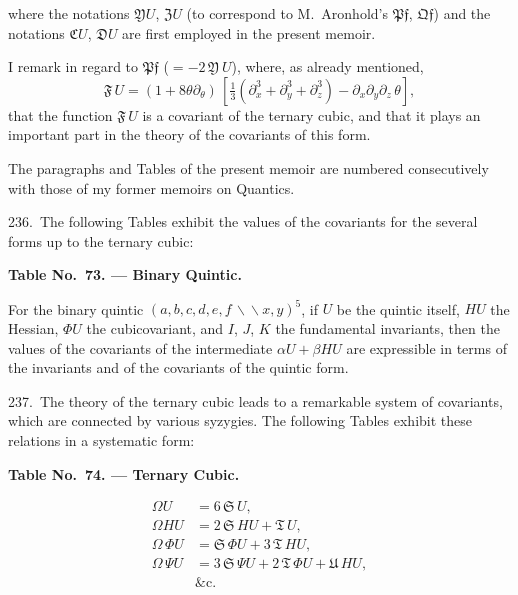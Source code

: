 \documentclass[11pt,a4paper]{article}
\theoremstyle{plain}
\theoremstyle{definition}
\theoremstyle{remark}
\begin{document}
where the notations $\mathfrak{Y}U$, $\mathfrak{Z}U$ (to correspond to M.~Aronhold's $\mathfrak{P}\mathfrak{f}$, $\mathfrak{Q}\mathfrak{f}$) and the notations $\mathfrak{C}U$, $\mathfrak{D}U$ are first employed in the present memoir.

\newpage
\setcounter{page}{332}

I remark in regard to $\mathfrak{P}\mathfrak{f}$ ($=-2\,\mathfrak{Y}\,U$), where, as already mentioned,
\[
\mathfrak{F}\,U = (1+8\theta\partial_\theta)\,[\tfrac{1}{3}(\partial_x^3+\partial_y^3+\partial_z^3)-\partial_x\partial_y\partial_z\,\theta],
\]
that the function $\mathfrak{F}\,U$ is a covariant of the ternary cubic, and that it plays an important part in the theory of the covariants of this form.

\newpage
\setcounter{page}{333}

The paragraphs and Tables of the present memoir are numbered consecutively with those of my former memoirs on Quantics.

236.\ The following Tables exhibit the values of the covariants for the several forms up to the ternary cubic:

\begin{center}
\textbf{Table No.~73. --- Binary Quintic.}
\end{center}

For the binary quintic $(a,b,c,d,e,f\,\backslash\!\!\backslash x,y)^5$, if $U$ be the quintic itself, $HU$ the Hessian, $\Phi U$ the cubicovariant, and $I$, $J$, $K$ the fundamental invariants, then the values of the covariants of the intermediate $\alpha U+\beta HU$ are expressible in terms of the invariants and of the covariants of the quintic form.

237.\ The theory of the ternary cubic leads to a remarkable system of covariants, which are connected by various syzygies. The following Tables exhibit these relations in a systematic form:

\begin{center}
\textbf{Table No.~74. --- Ternary Cubic.}
\end{center}

\begin{align*}
\Omega U &= 6\,\mathfrak{S}\,U,\\
\Omega HU &= 2\,\mathfrak{S}\,HU+\mathfrak{T}\,U,\\
\Omega\,\Phi U &= \mathfrak{S}\,\Phi U+3\,\mathfrak{T}\,HU,\\
\Omega\,\Psi U &= 3\,\mathfrak{S}\,\Psi U+2\,\mathfrak{T}\,\Phi U+\mathfrak{U}\,HU,\\
&\text{\&c.}
\end{align*}
\end{document}
